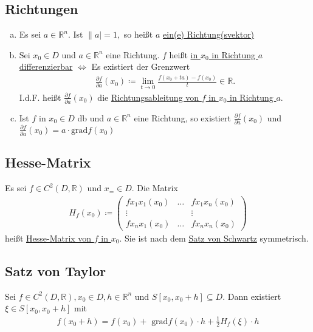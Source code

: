 \subsection{Richtungen}
\begin{enumerate}[a)]
    \item Es sei $a \in \mathbb{R}^n$. Ist $\lVert a \rvert = 1,$ so heißt $a$ \underline{ein(e) Richtung(svektor)}
    \item Sei $x_0 \in D$ und $a \in \mathbb{R}^n$ eine Richtung. $f$ heißt \underline{in $x_0$ in Richtung $a$ differenzierbar} $\Leftrightarrow$ Es existiert der Grenzwert
    \begin{align*}
        \frac{\partial f}{\partial a}(x_0) \coloneqq \lim \limits_{t \to 0} \frac{f(x_0 + ta) -f(x_0)}{t} \in \mathbb{R}.
    \end{align*}
    I.d.F. heißt $\frac{\partial f}{\partial a}(x_0)$ die \underline{Richtungsableitung von $f$ in $x_0$ in Richtung $a$}.
    \item Ist $f$ in $x_0 \in D$ db und $a \in \mathbb{R}^n$ eine Richtung, so existiert $\frac{\partial f}{\partial a}(x_0)$ und 
    $\frac{\partial f}{\partial a}(x_0) = a \cdot \text{grad}f(x_0)$
\end{enumerate}

\subsection{Hesse-Matrix}
Es sei $f \in C^2(D,\mathbb{R})$ und $x_= \in D$. Die Matrix 
\begin{align*}
    H_f(x_0) \coloneqq \begin{pmatrix} f{x_1x_1}(x_0) & \ldots & f{x_1x_n}(x_0) \\ \vdots & & \vdots \\ f{x_nx_1}(x_0) & \ldots & f{x_nx_n}(x_0)\end{pmatrix}
\end{align*}
heißt \underline{Hesse-Matrix von $f$ in $x_0$}. Sie ist nach dem \hyperref[sec: Schwartz]{Satz von Schwartz} symmetrisch.

\subsection{Satz von Taylor}
Sei $f \in C^2(D,\mathbb{R}), x_0 \in D, h \in \mathbb{R}^n$ und $S[x_0,x_0+h] \subseteq D$. Dann existiert $\xi \in S[x_0,x_0+h]$ mit
\begin{align*}
    f(x_0+h) = f(x_0) + \text{ grad}f(x_0) \cdot h + \frac{1}{2} H_f(\xi) \cdot h
\end{align*}

